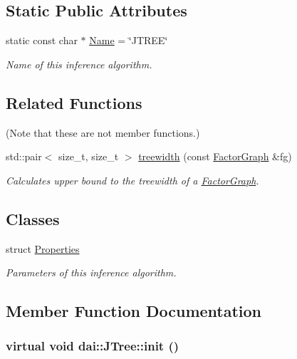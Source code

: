 \subsection*{Static Public Attributes}
\begin{CompactItemize}
\item 
\hypertarget{classdai_1_1JTree_e7c0a2ebb2675cb6f8441eae09f7f826}{
static const char $\ast$ \hyperlink{classdai_1_1JTree_e7c0a2ebb2675cb6f8441eae09f7f826}{Name} = \char`\"{}JTREE\char`\"{}}
\label{classdai_1_1JTree_e7c0a2ebb2675cb6f8441eae09f7f826}

\begin{CompactList}\small\item\em Name of this inference algorithm. \item\end{CompactList}\end{CompactItemize}
\subsection*{Related Functions}
(Note that these are not member functions.) \begin{CompactItemize}
\item 
std::pair$<$ size\_\-t, size\_\-t $>$ \hyperlink{classdai_1_1JTree_bca2633ffb8701cb62c54241bdad307e}{treewidth} (const \hyperlink{classdai_1_1FactorGraph}{FactorGraph} \&fg)
\begin{CompactList}\small\item\em Calculates upper bound to the treewidth of a \hyperlink{classdai_1_1FactorGraph}{FactorGraph}. \item\end{CompactList}\end{CompactItemize}
\subsection*{Classes}
\begin{CompactItemize}
\item 
struct \hyperlink{structdai_1_1JTree_1_1Properties}{Properties}
\begin{CompactList}\small\item\em Parameters of this inference algorithm. \item\end{CompactList}\end{CompactItemize}


\subsection{Member Function Documentation}
\hypertarget{classdai_1_1JTree_cbb2df1dc4e64097a46fc4cb1394e76f}{
\subsubsection[init]{\setlength{\rightskip}{0pt plus 5cm}virtual void dai::JTree::init ()}}
\label{classdai_1_1JTree_cbb2df1dc4e64097a46fc4cb1394e76f}


